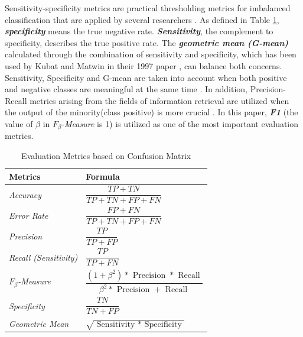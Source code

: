 Sensitivity-specificity metrics are practical thresholding metrics for imbalanced classification that are applied by several researchers \cite{49,50}. As defined in Table \ref{tab3}, \textbf{\textit{specificity}} means the true negative rate. \textbf{\textit{Sensitivity}}, the complement to specificity, describes the true positive rate. The \textbf{\textit{geometric mean (G-mean)}} calculated through the combination of sensitivity and specificity, which has been used by Kubat and Matwin in their 1997 paper \cite{58}, can balance both concerns. Sensitivity, Specificity and G-mean are taken into account when both positive and negative classes are meaningful at the same time \cite{48}. In addition, Precision-Recall metrics arising from the fields of information retrieval are utilized when the output of the minority(class positive) is more crucial \cite{52}. In this paper, \textbf{\textit{F1}} (the value of $\beta$ in $F_{\beta}$-\textit{Measure} is 1) is utilized as one of the most important evaluation metrics.
\begin{table}[h]
    \centering
    \renewcommand\arraystretch{2.5}
    \begin{tabular}{|m{}<{\centering}|m{}<{\centering}|}
    \hline
    Metrics                       & Formula                                                                                                                                 \\ \hline
   \textit{Accuracy}             & $\dfrac{T P+T N}{T P+T N+F P+F N}$                                                                                             \\ \hline
    \textit{Error Rate}           & $\dfrac{F P+F N}{T P+T N+F P+F N}$                                                                                             \\ \hline
    \textit{Precision}            & $\dfrac{T P}{T P+F P}$                                                                                                         \\ \hline
    \textit{Recall (Sensitivity)} & $\dfrac{T P}{T P+F N}$                                                                                                         \\ \hline
    \textit{$F_{\beta}$-Measure}  & $\dfrac{\left(1+\beta^{2}\right) * \text { Precision } * \text { Recall }}{\beta^{2} * \text { Precision }+\text { Recall }}$ \\ \hline
    \textit{Specificity}          & $\dfrac{T N}{T N+F P}$                                                                                                         \\ \hline
    \textit{Geometric Mean}       & $\sqrt{\text { Sensitivity } * \text { Specificity }}$                                                                         \\ \hline
    \end{tabular}
    \caption{Evaluation Metrics based on Confusion Matrix}
    \label{tab3}
\end{table}

